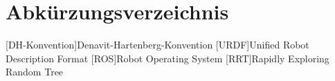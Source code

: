 \chapter*{Abkürzungsverzeichnis}

\begin{acronym}
 \setlength{\itemsep}{-0.5cm}
 [DH-Konvention]{Denavit-Hartenberg-Konvention}
 [URDF]{Unified Robot Description Format}
 [ROS]{Robot Operating System}
 [RRT]{Rapidly Exploring Random Tree}
\end{acronym}

